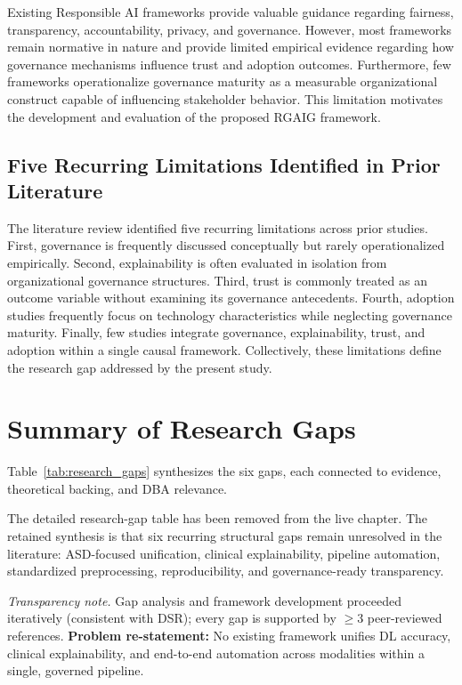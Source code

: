 \noindent Existing Responsible AI frameworks provide valuable guidance regarding fairness, transparency, accountability, privacy, and governance. However, most frameworks remain normative in nature and provide limited empirical evidence regarding how governance mechanisms influence trust and adoption outcomes. Furthermore, few frameworks operationalize governance maturity as a measurable organizational construct capable of influencing stakeholder behavior. This limitation motivates the development and evaluation of the proposed RGAIG framework.


\subsection{Five Recurring Limitations Identified in Prior Literature}
\label{sec:five_recurring_limitations}

\noindent The literature review identified five recurring limitations across prior studies. First, governance is frequently discussed conceptually but rarely operationalized empirically. Second, explainability is often evaluated in isolation from organizational governance structures. Third, trust is commonly treated as an outcome variable without examining its governance antecedents. Fourth, adoption studies frequently focus on technology characteristics while neglecting governance maturity. Finally, few studies integrate governance, explainability, trust, and adoption within a single causal framework. Collectively, these limitations define the research gap addressed by the present study.

\section{Summary of Research Gaps}

Table~\ref{tab:research_gaps} synthesizes the six gaps, each connected to evidence, theoretical backing, and DBA relevance.

\noindent The detailed research-gap table has been removed from the live chapter. The retained synthesis is that six recurring structural gaps remain unresolved in the literature: ASD-focused unification, clinical explainability, pipeline automation, standardized preprocessing, reproducibility, and governance-ready transparency.

\noindent\textit{Transparency note.} Gap analysis and framework development proceeded iteratively (consistent with DSR); every gap is supported by $\geq$3 peer-reviewed references. \textbf{Problem re-statement:} No existing framework unifies DL accuracy, clinical explainability, and end-to-end automation across modalities within a single, governed pipeline.

